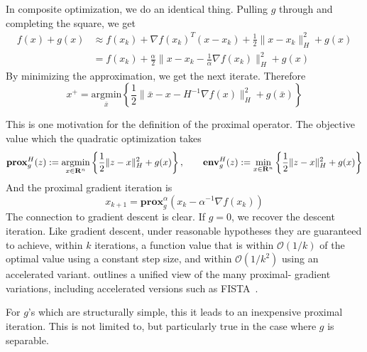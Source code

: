 In composite optimization, we do an identical thing. Pulling $g$ 
through and completing the square, we get
\begin{align*}
f(x)+g(x) & \approx f(x_{k})+\nabla f(x_{k})^{T}(x-x_{k})+\frac{1}{2}\|x-x_{k}\|_{H}^{2}+g(x)\\
 & =f(x_{k})+\frac{\alpha}{2}\|x-x_{k}-\frac{1}{\alpha}\nabla f(x_{k})\|_H^{2}+g(x)
\end{align*}
By minimizing the approximation, we get the next iterate. Therefore
$$
x^{+}=\underset{\bar{x}}{\mbox{argmin}}\left\{ 
\frac{1}{2}\|\bar{x}-x-H^{-1}\nabla f(x)\|_{H}^{2}
+g(\bar{x})\right\} 
$$

This is one
motivation for the definition of the proximal operator. The objective
value which the quadratic optimization takes $$
\mathbf{prox}^H_{g}(z):  =\underset{x\in\mathbf{R}^{n}}{\text{argmin}}\left\{
\frac{1}{2}\|z-x\|_H^{2}+g(x)\right\}, \qquad  \mathbf{env}^H_{g}(z):
=\underset{x\in\mathbf{R}^{n}}{\text{min}}\left\{
\frac{1}{2}\|z-x\|_H^{2}+g(x)\right\}  $$ And the proximal gradient
iteration is 
\begin{equation}\label{eq:prox-gradient}
x_{k+1}=\mathbf{prox}^\alpha_g(x_k-\alpha^{-1}\nabla f(x_k))
\end{equation}
The connection to gradient descent is clear. If $g=0$, we recover
the descent iteration. Like gradient descent, under reasonable
hypotheses they are guaranteed to achieve, within $k$ iterations, a
function value that is within $\mathcal{O}(1/k)$ of the optimal value
using a constant step size, and within $\mathcal{O}(1/k^2)$ using an
accelerated variant. \cite{Tseng:2010} outlines a unified view of the
many proximal- gradient variations, including accelerated versions
such as FISTA~\cite{beck2009fast}.

For $g$'s which are structurally simple, this it leads to an
inexpensive proximal iteration. This is not limited to, but
particularly true in the case where $g$ is separable.

